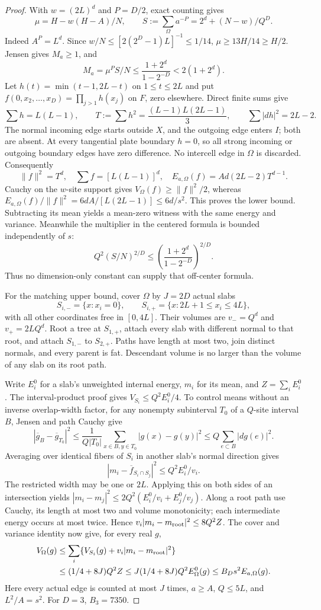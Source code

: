 \begin{proof}
With $w=(2L)^d$ and $P=D/2$, exact counting gives
\[
 \mu=H-w(H-A)/N,\qquad
 S:=\sum_\Omega a^{-P}=2^d+(N-w)/Q^D.
\]
Indeed $A^P=L^d$. Since
$w/N\le[2(2^D-1)L]^{-1}\le1/14$, $\mu\ge13H/14\ge H/2$.
Jensen gives $M_a\ge1$, and
\[
 M_a=\mu^P S/N
 \le\frac{1+2^d}{1-2^{-D}}<2(1+2^d).
\]
Let $h(t)=\min(t-1,2L-t)$ on $1\le t\le2L$ and put
$f(0,x_2,\ldots,x_D)=\prod_{j>1}h(x_j)$ on $F$, zero elsewhere.
Direct finite sums give
\[
 \sum h=L(L-1),\qquad
 T:=\sum h^2=\frac{(L-1)L(2L-1)}3,\qquad
 \sum|dh|^2=2L-2.
\]
The normal incoming edge starts outside $X$, and the outgoing edge enters
$I$; both are absent. At every tangential plate boundary $h=0$, so all
strong incoming or outgoing boundary edges have zero difference.
No intercell edge in $\Omega$ is discarded. Consequently
\[
 \|f\|^2=T^d,\quad \sum f=[L(L-1)]^d,\quad
 E_{a,\Omega}(f)=Ad(2L-2)T^{d-1}.
\]
Cauchy on the $w$-site support gives $V_\Omega(f)\ge\|f\|^2/2$,
whereas $E_{a,\Omega}(f)/\|f\|^2=6dA/[L(2L-1)]\le6d/s^2$.
This proves the lower bound. Subtracting its mean yields a mean-zero
witness with the same energy and variance. Meanwhile the multiplier
in the centered formula is bounded independently of $s$:
\[
 Q^2(S/N)^{2/D}
 \le\left(\frac{1+2^d}{1-2^{-D}}\right)^{2/D}.
\]
Thus no dimension-only constant can supply that off-center formula.

For the matching upper bound, cover $\Omega$ by $J=2D$ actual slabs
\[
 S_{i,-}=\{x:x_i=0\},\qquad
 S_{i,+}=\{x:2L+1\le x_i\le4L\},
\]
with all other coordinates free in $[0,4L]$. Their volumes are
$v_-=Q^d$ and $v_+=2LQ^d$. Root a tree at $S_{1,+}$, attach every
slab with different normal to that root, and attach $S_{1,-}$ to
$S_{2,+}$. Paths have length at most two, join distinct normals,
and every parent is fat. Descendant volume is no larger than the
volume of any slab on its root path.

Write $E_i^0$ for a slab's unweighted internal energy, $m_i$ for its
mean, and $Z=\sum_iE_i^0$. The interval-product proof gives
$V_{S_i}\le Q^2E_i^0/4$. To control means without an inverse
overlap-width factor, for any nonempty subinterval $T_0$ of a
$Q$-site interval $B$, Jensen and path Cauchy give
\[
 |\overline g_B-\overline g_{T_0}|^2
 \le\frac1{Q|T_0|}\sum_{x\in B,y\in T_0}|g(x)-g(y)|^2
 \le Q\sum_{e\subset B}|dg(e)|^2.
\]
Averaging over identical fibers of $S_i$ in another slab's normal
direction gives
\[
 |m_i-\overline f_{S_i\cap S_j}|^2\le Q^2E_i^0/v_i.
\]
The restricted width may be one or $2L$. Applying this on both sides
of an intersection yields
$|m_i-m_j|^2\le2Q^2(E_i^0/v_i+E_j^0/v_j)$.
Along a root path use Cauchy, its length at most two and volume
monotonicity; each intermediate energy occurs at most twice. Hence
$v_i|m_i-m_{\rm root}|^2\le8Q^2Z$. The cover and variance identity
now give, for every real $g$,
\begin{align*}
 V_\Omega(g)&\le\sum_i\{V_{S_i}(g)+v_i|m_i-m_{\rm root}|^2\}\\
 &\le(1/4+8J)Q^2Z
 \le J(1/4+8J)Q^2 E_\Omega^0(g)
 \le B_Ds^2E_{a,\Omega}(g).
\end{align*}
Here every actual edge is counted at most $J$ times, $a\ge A$,
$Q\le5L$, and $L^2/A=s^2$. For $D=3$, $B_3=7350$.


\end{proof}
